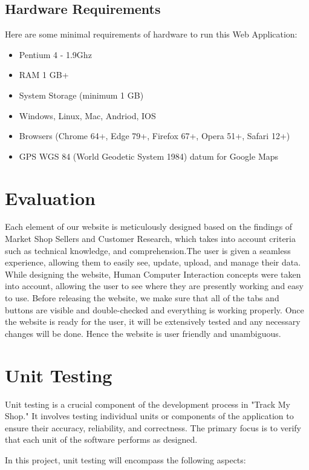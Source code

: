 \subsection{Hardware Requirements}
Here are some minimal requirements of hardware to run this Web Application:
\begin{itemize}
	\item Pentium 4 - 1.9Ghz  
	\item RAM 1 GB+ 
	\item System Storage (minimum 1 GB)
	\item Windows, Linux, Mac, Andriod, IOS
	\item Browsers (Chrome 64+, Edge 79+, Firefox 67+, Opera 51+, Safari 12+)
	\item GPS WGS 84 (World Geodetic System 1984) datum for Google Maps 
\end{itemize}


\section{Evaluation}
Each element of our website is meticulously designed based on the findings of Market Shop Sellers and Customer Research, which takes into account criteria such as technical knowledge, and comprehension.The user is given a seamless experience, allowing them to easily see, update, upload, and manage their data. While designing the website, Human Computer Interaction concepts were taken into account, allowing the user to see where they are presently working and easy to use. Before releasing the website, we make sure that all of the tabs and buttons are visible and double-checked and everything is working properly. Once the website is ready for the user, it will be extensively tested and any necessary changes will be done. Hence the website is user friendly and unambiguous.

\section{Unit Testing}

Unit testing is a crucial component of the development process in "Track My Shop." It involves testing individual units or components of the application to ensure their accuracy, reliability, and correctness. The primary focus is to verify that each unit of the software performs as designed.

In this project, unit testing will encompass the following aspects:

